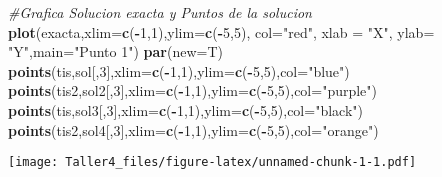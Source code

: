 \documentclass[]{article}
\newenvironment{Shaded}{\begin{snugshade}}{\end{snugshade}}
\newcommand{\KeywordTok}[1]{\textcolor[rgb]{0.13,0.29,0.53}{\textbf{#1}}}
\newcommand{\DataTypeTok}[1]{\textcolor[rgb]{0.13,0.29,0.53}{#1}}
\newcommand{\DecValTok}[1]{\textcolor[rgb]{0.00,0.00,0.81}{#1}}
\newcommand{\StringTok}[1]{\textcolor[rgb]{0.31,0.60,0.02}{#1}}
\newcommand{\CommentTok}[1]{\textcolor[rgb]{0.56,0.35,0.01}{\textit{#1}}}
\newcommand{\OperatorTok}[1]{\textcolor[rgb]{0.81,0.36,0.00}{\textbf{#1}}}
\newcommand{\NormalTok}[1]{#1}
\begin{document}
\begin{Shaded}
\begin{Highlighting}[]
\CommentTok{#Grafica Solucion exacta y Puntos de la solucion}
\KeywordTok{plot}\NormalTok{(exacta,}\DataTypeTok{xlim=}\KeywordTok{c}\NormalTok{(}\OperatorTok{-}\DecValTok{1}\NormalTok{,}\DecValTok{1}\NormalTok{),}\DataTypeTok{ylim=}\KeywordTok{c}\NormalTok{(}\OperatorTok{-}\DecValTok{5}\NormalTok{,}\DecValTok{5}\NormalTok{), }\DataTypeTok{col=}\StringTok{"red"}\NormalTok{, }\DataTypeTok{xlab =} \StringTok{"X"}\NormalTok{, }\DataTypeTok{ylab=} \StringTok{"Y"}\NormalTok{,}\DataTypeTok{main=}\StringTok{"Punto 1"}\NormalTok{)}
\KeywordTok{par}\NormalTok{(}\DataTypeTok{new=}\NormalTok{T)}
\KeywordTok{points}\NormalTok{(tis,sol[,}\DecValTok{3}\NormalTok{],}\DataTypeTok{xlim=}\KeywordTok{c}\NormalTok{(}\OperatorTok{-}\DecValTok{1}\NormalTok{,}\DecValTok{1}\NormalTok{),}\DataTypeTok{ylim=}\KeywordTok{c}\NormalTok{(}\OperatorTok{-}\DecValTok{5}\NormalTok{,}\DecValTok{5}\NormalTok{),}\DataTypeTok{col=}\StringTok{"blue"}\NormalTok{)}
\KeywordTok{points}\NormalTok{(tis2,sol2[,}\DecValTok{3}\NormalTok{],}\DataTypeTok{xlim=}\KeywordTok{c}\NormalTok{(}\OperatorTok{-}\DecValTok{1}\NormalTok{,}\DecValTok{1}\NormalTok{),}\DataTypeTok{ylim=}\KeywordTok{c}\NormalTok{(}\OperatorTok{-}\DecValTok{5}\NormalTok{,}\DecValTok{5}\NormalTok{),}\DataTypeTok{col=}\StringTok{"purple"}\NormalTok{)}
\KeywordTok{points}\NormalTok{(tis,sol3[,}\DecValTok{3}\NormalTok{],}\DataTypeTok{xlim=}\KeywordTok{c}\NormalTok{(}\OperatorTok{-}\DecValTok{1}\NormalTok{,}\DecValTok{1}\NormalTok{),}\DataTypeTok{ylim=}\KeywordTok{c}\NormalTok{(}\OperatorTok{-}\DecValTok{5}\NormalTok{,}\DecValTok{5}\NormalTok{),}\DataTypeTok{col=}\StringTok{"black"}\NormalTok{)}
\KeywordTok{points}\NormalTok{(tis2,sol4[,}\DecValTok{3}\NormalTok{],}\DataTypeTok{xlim=}\KeywordTok{c}\NormalTok{(}\OperatorTok{-}\DecValTok{1}\NormalTok{,}\DecValTok{1}\NormalTok{),}\DataTypeTok{ylim=}\KeywordTok{c}\NormalTok{(}\OperatorTok{-}\DecValTok{5}\NormalTok{,}\DecValTok{5}\NormalTok{),}\DataTypeTok{col=}\StringTok{"orange"}\NormalTok{)}
\end{Highlighting}
\end{Shaded}

\texttt{[image: Taller4\_files/figure-latex/unnamed-chunk-1-1.pdf]}
\end{document}
